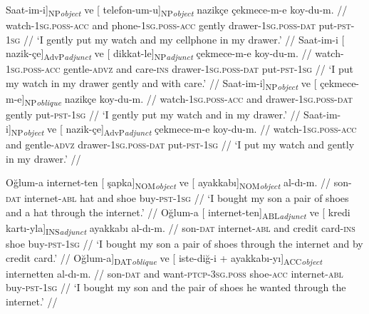 \pex[glspace=!1em,everygla={},everyglb={},aboveglbskip=-.15ex, interpartskip=15pt]
\label{cattokenset}
\a
\begingl
\gla {[} Saat-im-i{]}\textsubscript{NP\textit{object}} ve {[} telefon-um-u{]}\textsubscript{NP\textit{object}} nazikçe çekmece-m-e koy-du-m. //
\glb {}watch-\textsc{1sg.poss}-\textsc{acc}{} and {phone}-\textsc{1sg.poss}-\textsc{acc}{} gently drawer-\textsc{1sg.poss}-\textsc{dat} put-\textsc{pst}-\textsc{1sg} //
\glft `I gently put my watch and my cellphone in my drawer.'  //
\endgl
\a
\begingl\gla Saat-im-i {[} nazik-çe{]}\textsubscript{AdvP\textit{adjunct}} ve {[} dikkat-le{]}\textsubscript{NP\textit{adjunct}}  çekmece-m-e koy-du-m. //
\glb watch-\textsc{1sg.poss}-\textsc{acc} gentle-\textsc{advz} and care-\textsc{ins} drawer-\textsc{1sg.poss}-\textsc{dat} put-\textsc{pst}-\textsc{1sg} //
\glft `I put my watch in my drawer gently and with care.'  //
\endgl
\a
\begingl
\gla {[} Saat-im-i{]}\textsubscript{NP\textit{object}} ve {[} çekmece-m-e{]}\textsubscript{NP\textit{oblique}} nazikçe koy-du-m. //
\glb {}watch-\textsc{1sg.poss}-\textsc{acc}{} and {}drawer-\textsc{1sg.poss}-\textsc{dat}{} gently put-\textsc{pst}-\textsc{1sg} //
\glft `I gently put my watch and in my drawer.'  //
\endgl
\a
\begingl
\gla {[} Saat-im-i{]}\textsubscript{NP\textit{object}} ve {[} nazik-çe{]}\textsubscript{AdvP\textit{adjunct}} çekmece-m-e koy-du-m. //
\glb {}watch-\textsc{1sg.poss}-\textsc{acc}{} and {}gentle-\textsc{advz}{} drawer-\textsc{1sg.poss}-\textsc{dat}  put-\textsc{pst}-\textsc{1sg} //
\glft `I put my watch and gently in my drawer.'  //
\endgl
\xe


\pex[glspace=!1em,everygla={},everyglb={},aboveglbskip=-.15ex, interpartskip=15pt]
\label{casetokenset}
\a
\begingl
\gla Oğlum-a internet-ten {[} şapka{]}\textsubscript{NOM\textit{object}} ve {[} ayakkabı{]}\textsubscript{NOM\textit{object}} al-dı-m. //
\glb son-\textsc{dat} internet-\textsc{abl} hat and shoe buy-\textsc{pst}-\textsc{1sg} //
\glft `I bought my son a pair of shoes and a hat through the internet.'  //
\endgl
\a
\begingl
\gla Oğlum-a {[} internet-ten{]}\textsubscript{ABL\textit{adjunct}} ve {[} kredi kartı-yla{]}\textsubscript{INS\textit{adjunct}} ayakkabı al-dı-m. //
\glb son-\textsc{dat} internet-\textsc{abl} and credit card-\textsc{ins} shoe buy-\textsc{pst}-\textsc{1sg} //
\glft `I bought my son a pair of shoes through the internet and by credit card.'  //
\endgl
\a
\begingl
\gla {[} Oğlum-a{]}\textsubscript{DAT\textit{oblique}} ve {[} iste-diğ-i + ayakkabı-yı{]}\textsubscript{ACC\textit{object}} internetten al-dı-m. //
\glb {}son-\textsc{dat}{} and {}want-\textsc{ptcp}-\textsc{3sg.poss} shoe-\textsc{acc}{} internet-\textsc{abl} buy-\textsc{pst}-\textsc{1sg} //
\glft `I bought my son and the pair of shoes he wanted through the internet.'  //
\endgl
\xe

